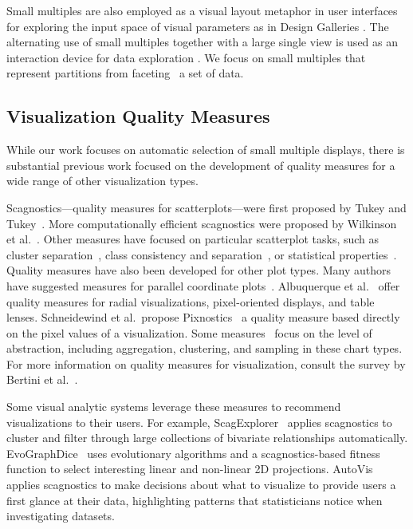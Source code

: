 
Small multiples are also employed as a visual layout metaphor in user interfaces for exploring the input space of visual parameters as in Design Galleries \cite{marks1997}. The alternating use of small multiples together with a large single view is used as an interaction device for data exploration \cite{van2013}. We focus on small multiples that represent partitions from faceting~\cite{Wilkinson2005GG} a set of data.

\subsection{Visualization Quality Measures}
While our work focuses on automatic selection of small multiple displays, there is substantial previous work focused on the development of quality measures for a wide range of other visualization types. 

Scagnostics---quality measures for scatterplots---were first proposed by Tukey and Tukey~\cite{Tukey1982, Tukey1985}. More computationally efficient scagnostics were proposed by Wilkinson et al.~\cite{Wilkinson2005, Wilkinson2008}. Other measures have focused on particular scatterplot tasks, such as cluster separation~\cite{Sedlmair2012, Tatu2009}, class consistency and separation~\cite{Sips2009, Schafer2013}, or statistical properties~\cite{Kandel2012, Seo2005, Piringer2008}.
Quality measures have also been developed for other plot types. Many authors have suggested measures for parallel coordinate plots~\cite{Ankerst1998, Dasgupta2010, Johansson2009, Yang2003}. Albuquerque et al.~\cite{Albuquerque2010} offer quality measures for radial visualizations, pixel-oriented displays, and table lenses. Schneidewind et al.\ propose Pixnostics~\cite{Schneidewind2006} a quality measure based directly on the pixel values of a visualization. Some measures~\cite{Bertini2006, Cui2006, Yang2003} focus on the level of abstraction, including aggregation, clustering, and sampling in these chart types. For more information on quality measures for visualization, consult the survey by Bertini et al.~\cite{Bertini2011}. 

Some visual analytic systems leverage these measures to recommend visualizations to their users. For example, ScagExplorer~\cite{Dang2014} applies scagnostics to cluster and filter through large collections of bivariate relationships automatically.
EvoGraphDice~\cite{Boukhelifa2013} uses evolutionary algorithms and a scagnostics-based fitness function to select interesting linear and non-linear 2D projections.
AutoVis~\cite{Wills2010} applies scagnostics to make decisions about what to visualize to provide users a first glance at their data, highlighting patterns that statisticians notice when investigating datasets.

